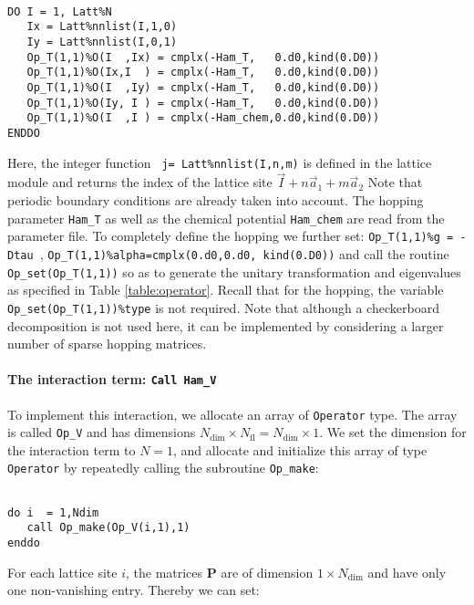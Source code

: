 \begin{lstlisting}

DO I = 1, Latt%N
   Ix = Latt%nnlist(I,1,0)
   Iy = Latt%nnlist(I,0,1)
   Op_T(1,1)%O(I  ,Ix) = cmplx(-Ham_T,   0.d0,kind(0.D0))
   Op_T(1,1)%O(Ix,I  ) = cmplx(-Ham_T,   0.d0,kind(0.D0))
   Op_T(1,1)%O(I  ,Iy) = cmplx(-Ham_T,   0.d0,kind(0.D0))
   Op_T(1,1)%O(Iy, I ) = cmplx(-Ham_T,   0.d0,kind(0.D0))
   Op_T(1,1)%O(I  ,I ) = cmplx(-Ham_chem,0.d0,kind(0.D0))
ENDDO

\end{lstlisting}
Here,    the integer  function \texttt{  j=  Latt\%nnlist(I,n,m)}   is defined in the lattice module and returns the index of the lattice site $ \vec{I} +  n \vec{a}_1 +  m \vec{a}_2$    Note that periodic boundary conditions are 
already taken into account.  The hopping parameter \texttt{Ham\_T} as well as the chemical potential \texttt{Ham\_chem} are read from the parameter file.  
To completely define the hopping  we further set: \texttt{Op\_T(1,1)\%g = -Dtau }, \texttt{Op\_T(1,1)\%alpha=cmplx(0.d0,0.d0, kind(0.D0))} and call the routine  \texttt{Op\_set(Op\_T(1,1))}  so as to generate  the unitary transformation and eigenvalues as specified in Table \ref{table:operator}.  Recall that for the hopping, the variable  \texttt{Op\_set(Op\_T(1,1))\%type}  is not  required. 
Note that although a checkerboard decomposition is not  used here,  it can be implemented by considering a larger number of sparse hopping matrices.


\paragraph{The interaction term: \texttt{Call Ham\_V}}

To implement this interaction, we allocate an array of \texttt{Operator} type. The array is called  \texttt{Op\_V} and has dimensions $N_{\mathrm{dim}}\times N_{\mathrm{fl}}=N_{\mathrm{dim}} \times 1$. 
We set the dimension for the interaction term to  $N=1$, and  allocate and initialize this array of type  \texttt{Operator} by repeatedly calling the subroutine \texttt{Op\_make}: 

\begin{lstlisting}

do i  = 1,Ndim
   call Op_make(Op_V(i,1),1)
enddo

\end{lstlisting}
For each lattice site $i$, the  matrices ${\bm P}$ are of dimension $1\times N_{\mathrm{dim}} $ and have only one non-vanishing entry. Thereby we can set:

